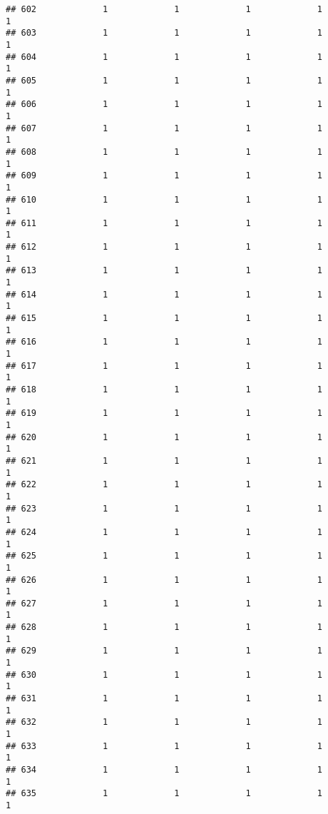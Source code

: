 \documentclass[
]{article}
\begin{document}
\begin{verbatim}
## 602             1             1             1             1             1
## 603             1             1             1             1             1
## 604             1             1             1             1             1
## 605             1             1             1             1             1
## 606             1             1             1             1             1
## 607             1             1             1             1             1
## 608             1             1             1             1             1
## 609             1             1             1             1             1
## 610             1             1             1             1             1
## 611             1             1             1             1             1
## 612             1             1             1             1             1
## 613             1             1             1             1             1
## 614             1             1             1             1             1
## 615             1             1             1             1             1
## 616             1             1             1             1             1
## 617             1             1             1             1             1
## 618             1             1             1             1             1
## 619             1             1             1             1             1
## 620             1             1             1             1             1
## 621             1             1             1             1             1
## 622             1             1             1             1             1
## 623             1             1             1             1             1
## 624             1             1             1             1             1
## 625             1             1             1             1             1
## 626             1             1             1             1             1
## 627             1             1             1             1             1
## 628             1             1             1             1             1
## 629             1             1             1             1             1
## 630             1             1             1             1             1
## 631             1             1             1             1             1
## 632             1             1             1             1             1
## 633             1             1             1             1             1
## 634             1             1             1             1             1
## 635             1             1             1             1             1

\end{verbatim}
\end{document}
